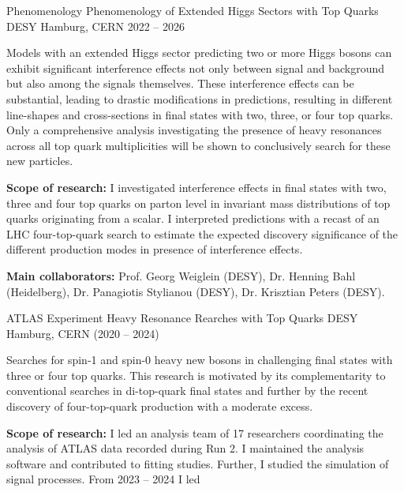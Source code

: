 \begin{cventries}
\cventry
{Phenomenology} %
{Phenomenology of Extended Higgs Sectors with Top Quarks} %
{DESY Hamburg, CERN} %
{2022 -- 2026} %
{
  \begin{cvitems} %
    \item {Models with an extended Higgs sector predicting two or more Higgs bosons can exhibit significant interference effects not only between signal and background but also among the signals themselves.
    These interference effects can be substantial, leading to drastic modifications in predictions,
    resulting in different line-shapes and cross-sections in final states with two, three, or four top quarks. Only a comprehensive analysis investigating the presence of heavy resonances across all top quark multiplicities will be shown to conclusively search for these new particles.}
    \item \textbf{Scope of research:} I investigated interference effects in final states with two, three and four top quarks on parton level in invariant mass distributions of top quarks originating from a scalar. I interpreted predictions with a recast of an LHC four-top-quark search to estimate the expected discovery significance of the different production modes in presence of interference effects.
    \item \textbf{Main collaborators:} Prof. Georg Weiglein (DESY), Dr. Henning Bahl (Heidelberg),
    Dr. Panagiotis Stylianou (DESY), Dr. Krisztian Peters (DESY).
  \end{cvitems}
}
\cventry
{ATLAS Experiment} %
{Heavy Resonance Rearches with Top Quarks} %
{DESY Hamburg, CERN} %
{(2020 – 2024)} %
{
  \begin{cvitems} %
    \item {Searches for spin-1 and spin-0 heavy new bosons in challenging final states with three or four top quarks. This research is motivated by its complementarity to conventional searches in di-top-quark final states and further by the recent discovery of four-top-quark production with a moderate excess.}
    \item \textbf{Scope of research:} I led an analysis team of 17 researchers coordinating the analysis of
    ATLAS data recorded during Run 2. I maintained the analysis software and contributed to fitting studies. Further, I studied the simulation of signal processes. From 2023 – 2024 I led

\end{cvitems}}
\end{cventries}
